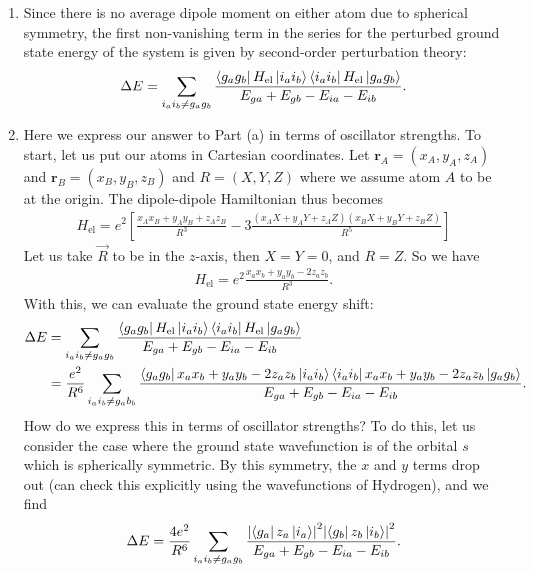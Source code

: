 \documentclass{article}
\theoremstyle{definition}
\newcommand{\f}[2]{\frac{#1}{#2}}
\newcommand{\lb}{\left[}
\newcommand{\rb}{\right]}
\begin{document}
\begin{enumerate}[label=(\alph*)]

\item Since there is no average dipole moment on either atom due to spherical symmetry, the first non-vanishing term in the series for the perturbed ground state energy of the system is given by second-order perturbation theory:
\begin{align*}
\Delta E = \sum_{i_a i_b \neq g_a g_b} \f{  \bra{g_a g_b}  H_\text{el} \ket{i_a i_b } \bra{i_a i_b}  H_\text{el} \ket{g_a g_b} }{E_{ga} + E_{gb}  - E_{ia} - E_{ib}}.
\end{align*}

\item Here we express our answer to Part (a) in terms of oscillator strengths. To start, let us put our atoms in Cartesian coordinates. Let $\mathbf{r}_A = (x_A, y_A, z_A)$ and $\mathbf{r}_B = (x_B, y_B, z_B)$ and $R = (X,Y,Z)$ where we assume atom $A$ to be at the origin. The dipole-dipole Hamiltonian thus becomes
\begin{align*}
H_\text{el}  = e^2 \lb \f{x_A x_B + y_A y_B + z_A z_B}{R^3} - 3\f{ (x_AX + y_A Y + z_A Z)(x_B X + y_B Y + z_B Z) }{R^5} \rb
\end{align*}
Let us take $\vec{R}$ to be in the $z$-axis, then $X=Y=0$, and $R = Z$. So we have
\begin{align*}
H_\text{el} =  e^2 \f{x_a x_b + y_a y_b- 2z_a z_b}{R^3}.
\end{align*}
With this, we can evaluate the ground state energy shift:
\begin{align*}
\Delta E 
&= \sum_{i_a i_b \neq g_a g_b} \f{  \bra{g_a g_b}  H_\text{el} \ket{i_a i_b } \bra{i_a i_b}  H_\text{el} \ket{g_a g_b} }{E_{ga} + E_{gb}  - E_{ia} - E_{ib}} \\
&= \f{e^2}{R^6} \sum_{i_ai_b \neq g_a b_b} 
\f{ 
 \bra{g_a g_b}  x_a x_b + y_a y_b - 2 z_a z_b   \ket{i_a i_b}   
 \bra{i_a i_b}  x_a x_b + y_a y_b - 2 z_a z_b  \ket{g_a g_b}   
}{E_{ga} + E_{gb}  - E_{ia} - E_{ib}}.
\end{align*}
How do we express this in terms of oscillator strengths? To do this, let us consider the case where the ground state wavefunction is of the orbital $s$ which is spherically symmetric. By this symmetry, the $x$ and $y$ terms drop out (can check this explicitly using the wavefunctions of Hydrogen), and we find 
\begin{align*}
\Delta E = \f{4e^2}{R^6} \sum_{i_ai_b \neq g_a g_b} \f{  \abs{\bra{g_a} z_a \ket{i_a}}^2  \abs{\bra{g_b} z_b \ket{i_b}}^2 }{E_{ga} + E_{gb} - E_{ia} - E_{ib}}.

\end{align*}
\end{enumerate}
\end{document}
